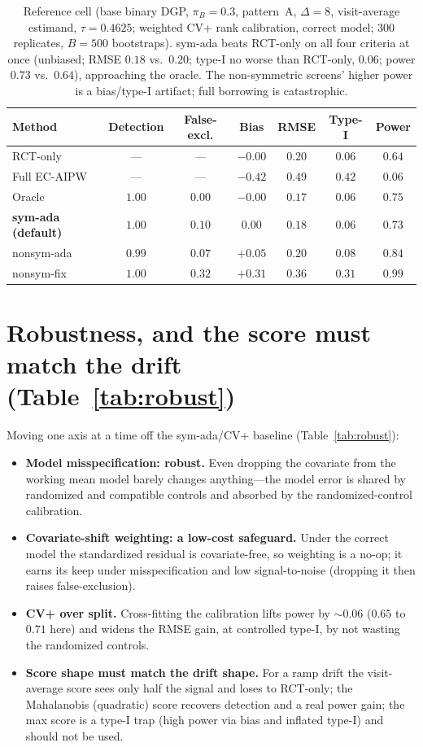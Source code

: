 \documentclass[11pt]{article}
\begin{document}
\begin{table}[ht]\centering
\caption{Reference cell (base binary DGP, $\pi_B{=}0.3$, pattern~A, $\Delta{=}8$, visit-average estimand, $\tau{=}0.4625$; weighted CV+ rank calibration, correct model; $300$ replicates, $B{=}500$ bootstraps). sym-ada beats RCT-only on all four criteria at once (unbiased; RMSE $0.18$ vs.\ $0.20$; type-I no worse than RCT-only, $0.06$; power $0.73$ vs.\ $0.64$), approaching the oracle. The non-symmetric screens' higher power is a bias/type-I artifact; full borrowing is catastrophic.}
\label{tab:ref}
\begin{tabular}{lcccccc}
\toprule
Method & Detection & False-excl. & Bias & RMSE & Type-I & Power \\
\midrule
RCT-only            & --- & --- & $-0.00$ & $0.20$ & $0.06$ & $0.64$ \\
Full EC-AIPW        & --- & --- & $-0.42$ & $0.49$ & $0.42$ & $0.06$ \\
Oracle              & $1.00$ & $0.00$ & $-0.00$ & $0.17$ & $0.06$ & $0.75$ \\
\midrule
\textbf{sym-ada (default)} & $1.00$ & $0.10$ & $0.00$ & $\mathbf{0.18}$ & $0.06$ & $\mathbf{0.73}$ \\
nonsym-ada          & $0.99$ & $0.07$ & $+0.05$ & $0.20$ & $0.08$ & $0.84$ \\
nonsym-fix          & $1.00$ & $0.32$ & $+0.31$ & $0.36$ & $0.31$ & $0.99$ \\
\bottomrule
\end{tabular}
\end{table}

\section{Robustness, and the score must match the drift (Table~\ref{tab:robust})}
Moving one axis at a time off the sym-ada/CV+ baseline (Table~\ref{tab:robust}):
\begin{itemize}\itemsep1pt
\item \textbf{Model misspecification: robust.} Even dropping the covariate from the working mean model barely changes anything---the model error is shared by randomized and compatible controls and absorbed by the randomized-control calibration.
\item \textbf{Covariate-shift weighting: a low-cost safeguard.} Under the correct model the standardized residual is covariate-free, so weighting is a no-op; it earns its keep under misspecification and low signal-to-noise (dropping it then raises false-exclusion).
\item \textbf{CV+ over split.} Cross-fitting the calibration lifts power by $\sim$$0.06$ ($0.65$ to $0.71$ here) and widens the RMSE gain, at controlled type-I, by not wasting the randomized controls.
\item \textbf{Score shape must match the drift shape.} For a ramp drift the visit-average score sees only half the signal and loses to RCT-only; the Mahalanobis (quadratic) score recovers detection and a real power gain; the max score is a type-I trap (high power via bias and inflated type-I) and should not be used.
\end{itemize}
\end{document}
